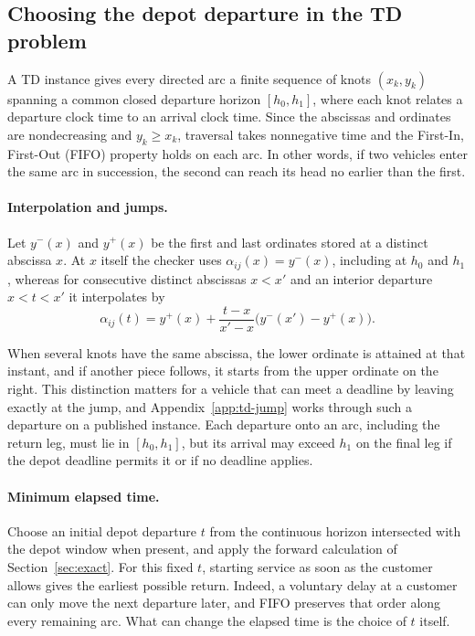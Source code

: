 \subsection{Choosing the depot departure in the TD problem}\label{sec:td-core}

A TD instance gives every directed arc a finite sequence of knots $(x_k,y_k)$ spanning a common closed departure horizon $[h_0,h_1]$, where each knot relates a departure clock time to an arrival clock time. Since the abscissas and ordinates are nondecreasing and $y_k\geq x_k$, traversal takes nonnegative time and the First-In, First-Out (FIFO) property holds on each arc. In other words, if two vehicles enter the same arc in succession, the second can reach its head no earlier than the first.

\paragraph{Interpolation and jumps.}

Let $y^-(x)$ and $y^+(x)$ be the first and last ordinates stored at a distinct abscissa $x$. At $x$ itself the checker uses $\alpha_{ij}(x)=y^-(x)$, including at $h_0$ and $h_1$, whereas for consecutive distinct abscissas $x<x'$ and an interior departure $x<t<x'$ it interpolates by
\begin{equation}\label{eq:td-arc-interpolation}
 \alpha_{ij}(t)=y^+(x)+\frac{t-x}{x'-x}\bigl(y^-(x')-y^+(x)\bigr).
\end{equation}

When several knots have the same abscissa, the lower ordinate is attained at that instant, and if another piece follows, it starts from the upper ordinate on the right. This distinction matters for a vehicle that can meet a deadline by leaving exactly at the jump, and Appendix~\ref{app:td-jump} works through such a departure on a published instance. Each departure onto an arc, including the return leg, must lie in $[h_0,h_1]$, but its arrival may exceed $h_1$ on the final leg if the depot deadline permits it or if no deadline applies.

\paragraph{Minimum elapsed time.}

Choose an initial depot departure $t$ from the continuous horizon intersected with the depot window when present, and apply the forward calculation of Section~\ref{sec:exact}. For this fixed $t$, starting service as soon as the customer allows gives the earliest possible return. Indeed, a voluntary delay at a customer can only move the next departure later, and FIFO preserves that order along every remaining arc. What can change the elapsed time is the choice of $t$ itself.

